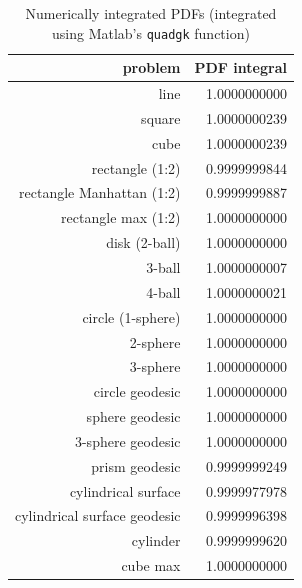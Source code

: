 \begin{table}[ht]
  \centering
  \begin{tabular}{r|r}
                  problem & PDF integral \\
     \hline 
                     line & 1.0000000000 \\
                   square & 1.0000000239 \\
                     cube & 1.0000000239 \\
          rectangle (1:2) & 0.9999999844 \\
rectangle Manhattan (1:2) & 0.9999999887 \\
      rectangle max (1:2) & 1.0000000000 \\
            disk (2-ball) & 1.0000000000 \\
                   3-ball & 1.0000000007 \\
                   4-ball & 1.0000000021 \\
        circle (1-sphere) & 1.0000000000 \\
                 2-sphere & 1.0000000000 \\
                 3-sphere & 1.0000000000 \\
          circle geodesic & 1.0000000000 \\
          sphere geodesic & 1.0000000000 \\
        3-sphere geodesic & 1.0000000000 \\
           prism geodesic & 0.9999999249 \\
      cylindrical surface & 0.9999977978 \\
cylindrical surface geodesic & 0.9999996398 \\
                 cylinder & 0.9999999620 \\
                 cube max & 1.0000000000 \\
  \end{tabular}
  \caption{Numerically integrated PDFs (integrated using Matlab's {\tt quadgk} function)}
  \label{tab:numerical_pdf_sum}
\end{table}
